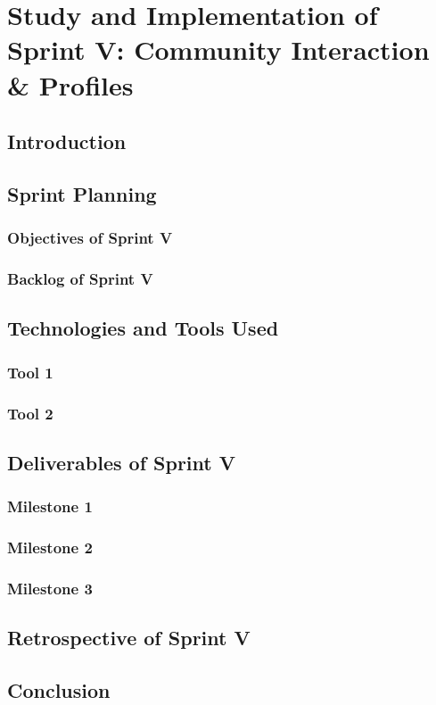 \documentclass[a4paper,12pt]{report}
\begin{document}
\chapter[Sprint V]{Study and Implementation of Sprint V: Community Interaction \& Profiles}

\minitoc
\section{Introduction}
\section{Sprint Planning}
\subsection{Objectives of Sprint V}
\subsection{Backlog of Sprint V}
\section{Technologies and Tools Used}
\subsection{Tool 1}
\subsection{Tool 2}
\section{Deliverables of Sprint V}
\subsection{Milestone 1}
\subsection{Milestone 2}
\subsection{Milestone 3}
\section{Retrospective of Sprint V}
\section{Conclusion}
\end{document}

